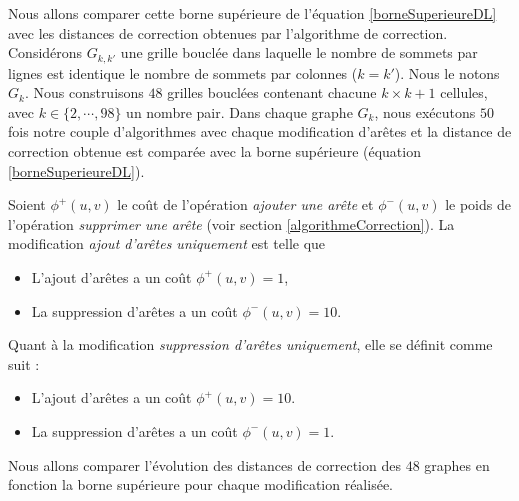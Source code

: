 Nous allons comparer cette borne sup\'erieure de l'\'equation \ref{borneSuperieureDL} avec les distances de correction obtenues par l'algorithme de correction.
\newline
Consid\'erons $G_{k,k'}$ une grille boucl\'ee dans laquelle le nombre de sommets par lignes est identique le nombre de sommets par colonnes ($k = k'$). Nous le notons $G_k$.
\newline
Nous construisons $48$ grilles boucl\'ees  contenant chacune $k \times k +1$ cellules, avec $k \in \{2,\cdots,98\}$ un nombre pair.
Dans chaque graphe $G_k$, nous ex\'ecutons   $50$ fois notre couple d'algorithmes avec chaque modification d'ar\^etes et la distance de correction obtenue est compar\'ee avec la borne sup\'erieure (\'equation \ref{borneSuperieureDL}).
\newline

Soient $\phi^{+}(u,v)$ le co\^ut de l'op\'eration {\em ajouter une ar\^ete} et 
$\phi^{-}(u,v)$ le poids de l'op\'eration {\em supprimer une ar\^ete} (voir section \ref{algorithmeCorrection}). 
\newline
La modification {\em ajout d'ar\^etes uniquement} est telle que 
\begin{itemize}
	\item L'ajout d'ar\^etes a un co\^ut  $\phi^{+}(u,v) = 1$,
	\item La suppression d'ar\^etes a un co\^ut  $\phi^{-}(u,v) = 10$.
\end{itemize}
Quant \`a la modification {\em suppression d'ar\^etes uniquement}, elle se d\'efinit comme suit :
\begin{itemize}
	\item L'ajout d'ar\^etes a un co\^ut  $\phi^{+}(u,v) = 10$.
	\item La suppression d'ar\^etes a un co\^ut  $\phi^{-}(u,v) = 1$.
\end{itemize}
Nous allons comparer l'\'evolution des distances de correction des $48$ graphes en fonction la borne sup\'erieure pour chaque modification r\'ealis\'ee.


